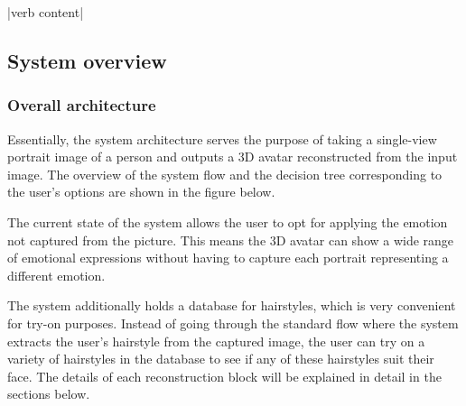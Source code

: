 
|verb content|




\subsection{System overview}

\subsubsection{Overall architecture}

Essentially, the system architecture serves the purpose of taking a single-view portrait image of a person and outputs a 3D avatar reconstructed from the input image. The overview of the system flow and the decision tree corresponding to the user's options are shown in the figure below.


The current state of the system allows the user to opt for applying the emotion not captured from the picture. This means the 3D avatar can show a wide range of emotional expressions without having to capture each portrait representing a different emotion.

The system additionally holds a database for hairstyles, which is very convenient for try-on purposes. Instead of going through the standard flow where the system extracts the user's hairstyle from the captured image, the user can try on a variety of hairstyles in the database to see if any of these hairstyles suit their face. The details of each reconstruction block will be explained in detail in the sections below.




